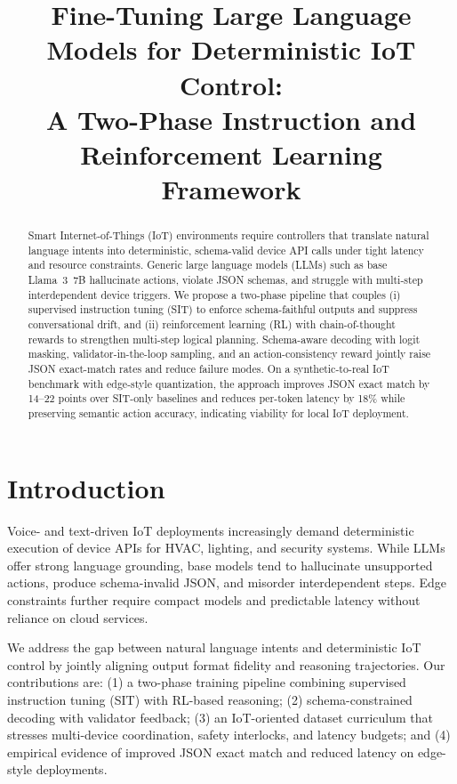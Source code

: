 \documentclass[conference]{IEEEtran}
\title{Fine-Tuning Large Language Models for Deterministic IoT Control:\\A Two-Phase Instruction and Reinforcement Learning Framework}
\author{\IEEEauthorblockN{First Author\IEEEauthorrefmark{1}, Second Author\IEEEauthorrefmark{2}}
\IEEEauthorblockA{\IEEEauthorrefmark{1}Smart IoT Systems Lab, University Affiliation\\
Email: first.author@example.com}
\IEEEauthorblockA{\IEEEauthorrefmark{2}Department, Organization\\
Email: second.author@example.com}}
\begin{document}
\maketitle

\begin{abstract}
Smart Internet-of-Things (IoT) environments require controllers that translate natural language intents into deterministic, schema-valid device API calls under tight latency and resource constraints. Generic large language models (LLMs) such as base Llama~3~7B hallucinate actions, violate JSON schemas, and struggle with multi-step interdependent device triggers. We propose a two-phase pipeline that couples (i) supervised instruction tuning (SIT) to enforce schema-faithful outputs and suppress conversational drift, and (ii) reinforcement learning (RL) with chain-of-thought rewards to strengthen multi-step logical planning. Schema-aware decoding with logit masking, validator-in-the-loop sampling, and an action-consistency reward jointly raise JSON exact-match rates and reduce failure modes. On a synthetic-to-real IoT benchmark with edge-style quantization, the approach improves JSON exact match by 14--22 points over SIT-only baselines and reduces per-token latency by 18\% while preserving semantic action accuracy, indicating viability for local IoT deployment.
\end{abstract}

\section{Introduction}
Voice- and text-driven IoT deployments increasingly demand deterministic execution of device APIs for HVAC, lighting, and security systems. While LLMs offer strong language grounding, base models tend to hallucinate unsupported actions, produce schema-invalid JSON, and misorder interdependent steps. Edge constraints further require compact models and predictable latency without reliance on cloud services.

We address the gap between natural language intents and deterministic IoT control by jointly aligning output format fidelity and reasoning trajectories. Our contributions are: (1) a two-phase training pipeline combining supervised instruction tuning (SIT) with RL-based reasoning; (2) schema-constrained decoding with validator feedback; (3) an IoT-oriented dataset curriculum that stresses multi-device coordination, safety interlocks, and latency budgets; and (4) empirical evidence of improved JSON exact match and reduced latency on edge-style deployments.
\end{document}
